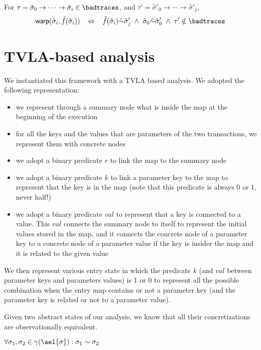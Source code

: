For $\tau = \hat{\sigma}_0 \to \cdots \to \hat{\sigma}_i \in \badtraces$, 
and $\tau' = \hat{\sigma}'_0 \to \cdots \to \hat{\sigma}'_j$,
$$
\warp(\hat{\sigma}_i,\hat{f}(\hat{\sigma}_i))
\;\;\;\Leftrightarrow\;\;\;
\hat{f}(\hat{\sigma}_i) \hat{\sim} \hat{\sigma}_j'
\;\wedge\;
\hat{\sigma}_0 \hat{\sim} \hat{\sigma}'_0
\;\wedge\;
\tau' \notin \badtraces
$$





\section{TVLA-based analysis}

We instantiated this framework with a TVLA based analysis. We adopted the following representation:
\begin{itemize}
\item we represent through a summary node what is inside the map at the beginning of the execution
\item for all the keys and the values that are parameters of the two transactions, we represent them with concrete nodes
\item we adopt a binary predicate $r$ to link the map to the summary node
\item we adopt a binary predicate $k$ to link a parameter key to the map to represent that the key is in the map (note that this predicate is always 0 or 1, never half!)
\item we adopt a binary predicate $val$ to represent that a key is connected to a value. This $val$ connects the summary node to itself to represent the initial values stored in the map, and it connects the concrete node of a parameter key to a concrete node of a parameter value if the key is insider the map and it is related to the given value
\end{itemize}

We then represent various entry state in which the predicate $k$ (and $val$ between parameter keys and parameters values) is 1 or 0 to represent all the possible combination when the entry map contains or not a parameter key (and the parameter key is related or not to a parameter value).

Given two abstract states of our analysis, we know that all their concretizations are observationally equivalent.

\begin{theorem}
$\forall \sigma_1, \sigma_2 \in \gamma({\ael{\sigma}}) : \sigma_1 \sim \sigma_2$
\end{theorem}


